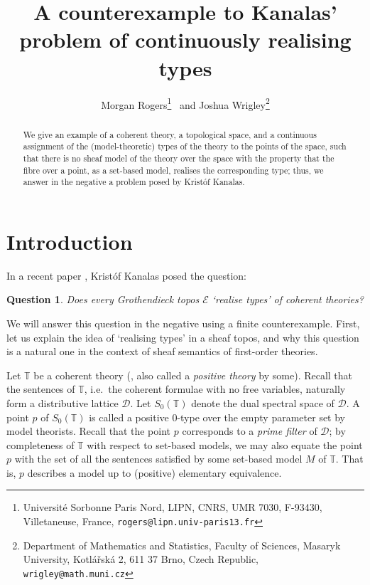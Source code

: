 \documentclass{article}
\title{A counterexample to Kanalas' problem of continuously realising types}
\author{Morgan Rogers\footnote{Université Sorbonne Paris Nord, LIPN, CNRS, UMR 7030, F-93430, Villetaneuse, France, \texttt{rogers@lipn.univ-paris13.fr}} \ and 
	Joshua Wrigley\footnote{Department of Mathematics and Statistics, Faculty of Sciences, Masaryk University, Kotlářská 2, 611 37 Brno, Czech Republic, \texttt{wrigley@math.muni.cz}}}
\date{}
\theoremstyle{plain}
\newtheorem{question}[thm]{Question}
\theoremstyle{definition}
\newcommand{\dcat}{\mathcal{D}}
\newcommand{\topos}{\mathcal{E}}
\newcommand{\theory}{\mathbb{T}}
\begin{document}
	
	\maketitle
	
	\begin{abstract}
		We give an example of a coherent theory, a topological space, and a continuous assignment of the (model-theoretic) types of the theory to the points of the space, such that there is no sheaf model of the theory over the space with the property that the fibre over a point, as a set-based model, realises the corresponding type; thus, we answer in the negative a problem posed by Krist\'of Kanalas.
	\end{abstract}
	
	\renewcommand{\thefootnote}{\fnsymbol{footnote}} 
	\renewcommand{\thefootnote}{\arabic{footnote}} 
	
	\section{Introduction}
	In a recent paper \cite[Question 3.6]{kanalas_apal}, Krist\'of Kanalas posed the question: 
	\begin{question}\label{question_1}
		Does every Grothendieck topos $\topos$ `realise types' of coherent theories?
	\end{question}
	We will answer this question in the negative using a finite counterexample.  First, let us explain the idea of `realising types' in a sheaf topos, and why this question is a natural one in the context of sheaf semantics of first-order theories.
	
	Let $\theory$ be a coherent theory (\cite[Definition D1.1.6]{elephant}, also called a \emph{positive theory} by some).  Recall that the sentences of $\theory$, i.e.\ the coherent formulae with no free variables, naturally form a distributive lattice $\dcat$.  Let $S_0(\theory)$ denote the dual spectral space of $\dcat$.  A point $p$ of $S_0(\theory)$ is called a positive $0$-type over the empty parameter set by model theorists.  Recall that the point $p$ corresponds to a \emph{prime filter} of $\dcat$; by completeness of $\theory$ with respect to set-based models, we may also equate the point $p$ with the set of all the sentences satisfied by some set-based model $M$ of $\theory$.  That is, $p$ describes a model up to (positive) elementary equivalence.
	
\end{document}
